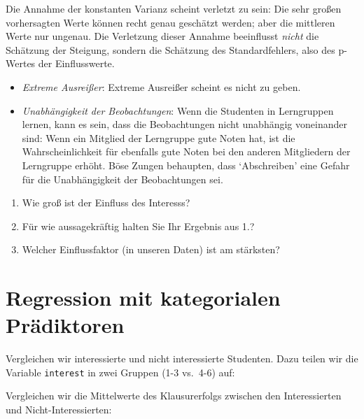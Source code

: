 \documentclass[12pt,ngerman,]{book}
\makeatletter
\newenvironment{Shaded}{\begin{snugshade}}{\end{snugshade}}
\newcommand{\DecValTok}[1]{\textcolor[rgb]{0.00,0.00,0.81}{#1}}
\newcommand{\StringTok}[1]{\textcolor[rgb]{0.31,0.60,0.02}{#1}}
\newcommand{\OperatorTok}[1]{\textcolor[rgb]{0.81,0.36,0.00}{\textbf{#1}}}
\newcommand{\NormalTok}[1]{#1}
\newenvironment{kframe}{%
\medskip{}
\setlength{\fboxsep}{.8em}
 \def\at@end@of@kframe{}%
 \ifinner\ifhmode%
  \def\at@end@of@kframe{\end{minipage}}%
  \begin{minipage}{\columnwidth}%
 \fi\fi%
 \def\FrameCommand##1{\hskip\@totalleftmargin \hskip-\fboxsep
 \colorbox{shadecolor}{##1}\hskip-\fboxsep
     \hskip-\linewidth \hskip-\@totalleftmargin \hskip\columnwidth}%
 \MakeFramed {\advance\hsize-\width
   \@totalleftmargin\z@ \linewidth\hsize
   \@setminipage}}%
 {\par\unskip\endMakeFramed%
 \at@end@of@kframe}
\renewenvironment{Shaded}{\begin{kframe}}{\end{kframe}}
\theoremstyle{definition}
\theoremstyle{definition}
\theoremstyle{remark}
\let\BeginKnitrBlock\begin \let\EndKnitrBlock\end
\makeatother
\begin{document}
Die Annahme der konstanten Varianz scheint verletzt zu sein: Die sehr
großen vorhersagten Werte können recht genau geschätzt werden; aber die
mittleren Werte nur ungenau. Die Verletzung dieser Annahme beeinflusst
\emph{nicht} die Schätzung der Steigung, sondern die Schätzung des
Standardfehlers, also des p-Wertes der Einflusswerte.

\begin{itemize}
\item
  \emph{Extreme Ausreißer}: Extreme Ausreißer scheint es nicht zu geben.
\item
  \emph{Unabhängigkeit der Beobachtungen}: Wenn die Studenten in
  Lerngruppen lernen, kann es sein, dass die Beobachtungen nicht
  unabhängig voneinander sind: Wenn ein Mitglied der Lerngruppe gute
  Noten hat, ist die Wahrscheinlichkeit für ebenfalls gute Noten bei den
  anderen Mitgliedern der Lerngruppe erhöht. Böse Zungen behaupten, dass
  `Abschreiben' eine Gefahr für die Unabhängigkeit der Beobachtungen
  sei.
\end{itemize}

\BeginKnitrBlock{rmdexercises}
\begin{enumerate}
\def\labelenumi{\arabic{enumi}.}
\item
  Wie groß ist der Einfluss des Interesss?
\item
  Für wie aussagekräftig halten Sie Ihr Ergebnis aus 1.?
\item
  Welcher Einflussfaktor (in unseren Daten) ist am stärksten?
\end{enumerate}
\EndKnitrBlock{rmdexercises}

\section{Regression mit kategorialen
Prädiktoren}\label{regression-mit-kategorialen-pradiktoren}

Vergleichen wir interessierte und nicht interessierte Studenten. Dazu
teilen wir die Variable \texttt{interest} in zwei Gruppen (1-3 vs.~4-6)
auf:

\begin{Shaded}
\end{Shaded}

Vergleichen wir die Mittelwerte des Klausurerfolgs zwischen den
Interessierten und Nicht-Interessierten:
\end{document}
